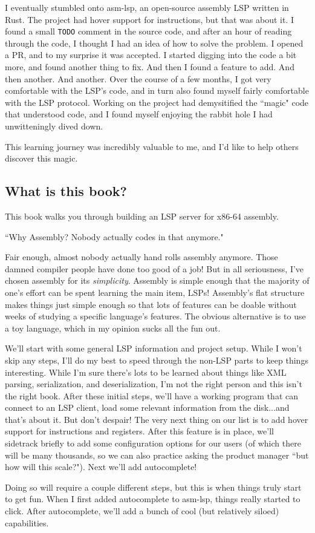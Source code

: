I eventually stumbled onto asm-lsp, an open-source assembly LSP written in Rust.
The project had hover support for instructions, but that was about it. I found a small \texttt{TODO} comment
in the source code, and after an hour of reading through the code, I thought I had an idea of how to solve the
problem. I opened a PR, and to my surprise it was accepted. I started digging into the code a bit more, and
found another thing to fix. And then I found a feature to add. And then another. And another. Over the course
of a few months, I got very comfortable with the LSP's code, and in turn also found myself fairly 
comfortable with the LSP protocol. Working on the project had demysitified the ``magic" code that understood code,
and I found myself enjoying the rabbit hole I had unwitteningly dived down.

This learning journey was incredibly valuable to me, and I'd like to help others 
discover this magic. 



\subsection{What is this book?}

This book walks you through building an LSP server for x86-64 assembly. 

``Why Assembly? Nobody actually codes in that anymore." 

Fair enough, almost nobody actually hand rolls assembly anymore. Those damned compiler people have done
too good of a job! But in all seriousness, I've chosen assembly for its \textit{simplicity}. Assembly is simple
enough that the majority of one's effort can be spent learning the main item, LSPs! Assembly's flat structure
makes things just simple enough so that lots of features can be doable without weeks of studying a specific
language's features. The obvious alternative is to use a toy language, which in my opinion sucks all the fun out. 

We'll start with some general LSP information and project setup. While I won't skip
any steps, I'll do my best to speed through the non-LSP parts to keep things interesting.
While I'm sure there's lots to be learned about things like XML parsing, serialization, 
and deserialization, I'm not the right person and this isn't the right book. After
these initial steps, we'll have a working program that can connect to an LSP client,
load some relevant information from the disk...and that's about it. But don't despair!
The very next thing on our list is to add hover support for instructions and registers.
After this feature is in place, we'll sidetrack briefly to add some configuration
options for our users (of which there will be many thousands, so we can also practice
asking the product manager ``but how will this scale?"). Next we'll add autocomplete!

Doing so will require a couple different steps, but this is when things truly start
to get fun. When I first added autocomplete to asm-lsp, things really started to
click. After autocomplete, we'll add a bunch of cool (but relatively siloed) capabilities.
